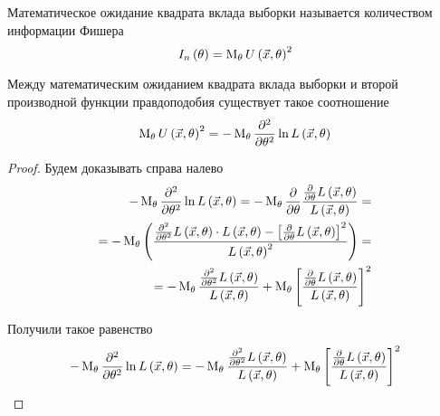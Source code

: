 \begin{definition}
    Математическое ожидание квадрата вклада выборки называется
    количеством информации Фишера
    $$I_n\left(\theta\right)=
        \operatorname{M}_{\theta} U\left( \vec{x},\theta \right)^2$$
\end{definition}
\begin{remark}
    Между математическим ожиданием квадрата вклада выборки и второй производной
    функции правдоподобия существует такое соотношение
    $$\operatorname{M}_{\theta} U\left( \vec{x},\theta \right)^2
        =-\operatorname{M}_{\theta} 
            \frac{\partial^2}{\partial\theta^2}
            \ln{L\left( \vec{x},\theta \right)}$$
\end{remark}
\begin{proof}
    Будем доказывать справа налево
    \begin{align*}
        -\operatorname{M}_{\theta} 
            \frac{\partial^2}{\partial\theta^2}
            \ln{L\left( \vec{x},\theta \right)}=
        -\operatorname{M}_{\theta} 
            \frac{\partial}{\partial\theta}
            \frac{\frac{\partial}{\partial\theta}L\left(\vec{x},\theta\right)}
                {L\left(\vec{x},\theta\right)}=\\
        =-\operatorname{M}_{\theta} 
            \left(
            \frac{\frac{\partial^2}{\partial\theta^2}
                L\left(\vec{x},\theta\right)\cdot L\left(\vec{x},\theta\right)-
                    \left[\frac{\partial}{\partial\theta}
                        L\left(\vec{x},\theta\right)\right]^2
                }
                {L\left(\vec{x},\theta\right)^2}
                \right)=\\
        =-\operatorname{M}_{\theta} 
            \frac{\frac{\partial^2}{\partial\theta^2}
                L\left(\vec{x},\theta\right)}
                {L\left(\vec{x},\theta\right)}
            +\operatorname{M}_{\theta} 
                \left[\frac{\frac{\partial}{\partial\theta}
                    L\left(\vec{x},\theta\right)}
                    {L\left(\vec{x},\theta\right)}\right]^2
    \end{align*}

    Получили такое равенство
    \begin{equation}\label{eq:ULProofStart}
        - \operatorname{M}_{\theta} \frac{\partial^2}{\partial\theta^2}
            \ln{L\left( \vec{x},\theta \right)}
        = -\operatorname{M}_{\theta} 
            \frac{\frac{\partial^2}{\partial\theta^2}
                L\left(\vec{x},\theta\right)}
                {L\left(\vec{x},\theta\right)}
            +\operatorname{M}_{\theta} 
                \left[\frac{\frac{\partial}{\partial\theta}
                    L\left(\vec{x},\theta\right)}
                    {L\left(\vec{x},\theta\right)}\right]^2
    \end{equation}
    

\end{proof}
